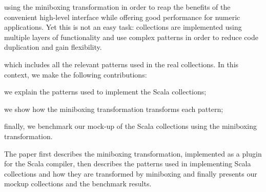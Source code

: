  using the miniboxing transformation in order to reap the benefits of the convenient high-level interface while offering good performance for numeric applications. Yet this is not an easy task: collections are implemented using multiple layers of functionality and use complex patterns in order to reduce code duplication and gain flexibility.

 which includes all the relevant patterns used in the real collections. In this context, we make the following contributions:

\begin{packed_item}
\item we explain the patterns used to implement the Scala collections;
\item we show how the miniboxing transformation transforms each pattern;
\item finally, we benchmark our mock-up of the Scala collections using the miniboxing transformation.
\end{packed_item}

The paper first describes the miniboxing transformation, implemented as a plugin for the Scala compiler, then describes the patterns used in implementing Scala collections and how they are transformed by miniboxing and finally presents our mockup collections and the benchmark results.